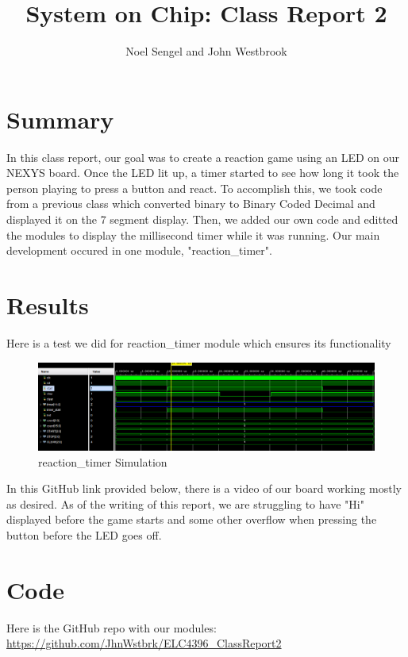 \documentclass[11pt]{article}
\begin{document}
\title{System on Chip: Class Report 2}
\author{Noel Sengel and John Westbrook}

\maketitle


\section*{Summary}

In this class report, our goal was to create a reaction game using an LED on our NEXYS board. Once the LED lit up, a timer started to see how long it took the person playing to press a button and react. To accomplish this, we took code from a previous class which converted binary to Binary Coded Decimal and displayed it on the 7 segment display. Then, we added our own code and editted the modules to display the millisecond timer while it was running. Our main development occured in one module, "reaction\_timer".


\section*{Results}

Here is a test we did for reaction\_timer module which ensures its functionality
\begin{figure}[ht]\centering
	\includegraphics[width=\textwidth]{image_2023-09-14_215312515.png}
	\caption{reaction\_timer Simulation}
	\label{fig1}
\end{figure}

In this GitHub link provided below, there is a video of our board working mostly as desired. As of the writing of this report, we are struggling to have "Hi" displayed before the game starts and some other overflow when pressing the button before the LED goes off.
\section*{Code}

Here is the GitHub repo with our modules: 
\url{https://github.com/JhnWstbrk/ELC4396_ClassReport2}
\end{document}
